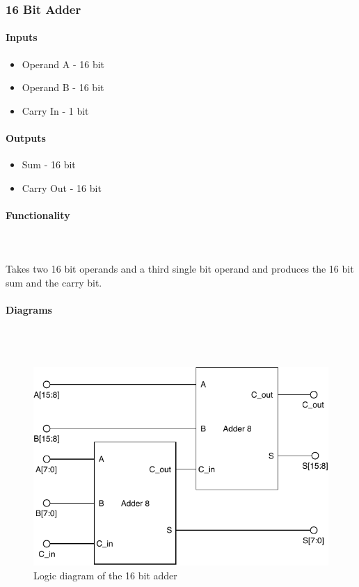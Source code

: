 \documentclass{article}
\begin{document}

    \subsubsection{16 Bit Adder}

    \paragraph{Inputs}
    \begin{itemize}
        \item Operand A - 16 bit
        \item Operand B - 16 bit
        \item Carry In - 1 bit
    \end{itemize}

    \paragraph{Outputs}
    \begin{itemize}
        \item Sum - 16 bit
        \item Carry Out - 16 bit
    \end{itemize}

    \paragraph{Functionality}
    \hfill\\\\
    Takes two 16 bit operands and a third single bit operand and produces the
    16 bit sum and the carry bit.

    \paragraph{Diagrams}
    \hfill\\\\
    \begin{figure}[H]
        \centering
        \includegraphics{../diagrams/alu/adder/adder_16.pdf}
        \caption{Logic diagram of the 16 bit adder}
    \end{figure}
\end{document}
